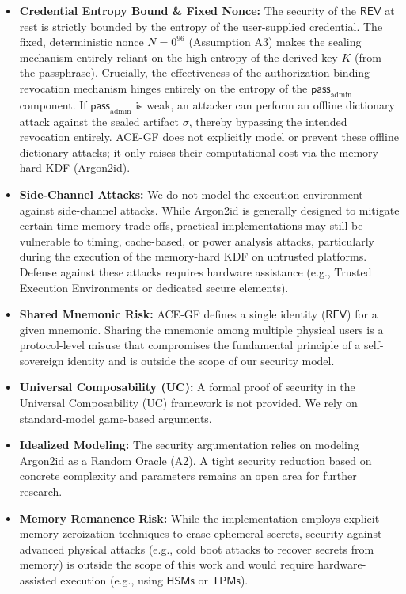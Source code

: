 \documentclass[12pt,a4paper]{article}
\begin{document}
  \begin{itemize}
   \item \textbf{Credential Entropy Bound \& Fixed Nonce:} The security of the $\mathsf{REV}$ at rest is strictly bounded by the entropy of the user-supplied credential. The fixed, deterministic nonce $N=0^{96}$ (Assumption A3) makes the sealing mechanism entirely reliant on the high entropy of the derived key $K$ (from the passphrase). Crucially, the effectiveness of the authorization-binding revocation mechanism hinges entirely on the entropy of the $\mathsf{pass}_{\mathrm{admin}}$ component. If $\mathsf{pass}_{\mathrm{admin}}$ is weak, an attacker can perform an offline dictionary attack against the sealed artifact $\sigma$, thereby bypassing the intended revocation entirely. ACE-GF does not explicitly model or prevent these offline dictionary attacks; it only raises their computational cost via the memory-hard KDF (Argon2id).
   \item \textbf{Side-Channel Attacks:} We do not model the execution environment against side-channel attacks. While Argon2id is generally designed to mitigate certain time-memory trade-offs, practical implementations may still be vulnerable to timing, cache-based, or power analysis attacks, particularly during the execution of the memory-hard KDF on untrusted platforms. Defense against these attacks requires hardware assistance (e.g., Trusted Execution Environments or dedicated secure elements).
   \item \textbf{Shared Mnemonic Risk:} ACE-GF defines a single identity ($\mathsf{REV}$) for a given mnemonic. Sharing the mnemonic among multiple physical users is a protocol-level misuse that compromises the fundamental principle of a self-sovereign identity and is outside the scope of our security model.
   \item \textbf{Universal Composability (UC):} A formal proof of security in the Universal Composability (UC) framework is not provided. We rely on standard-model game-based arguments.
   \item \textbf{Idealized Modeling:} The security argumentation relies on modeling Argon2id as a Random Oracle (A2). A tight security reduction based on concrete complexity and parameters remains an open area for further research.
   \item \textbf{Memory Remanence Risk:} While the implementation employs explicit memory zeroization techniques to erase ephemeral secrets, security against advanced physical attacks (e.g., cold boot attacks to recover secrets from memory) is outside the scope of this work and would require hardware-assisted execution (e.g., using $\mathsf{HSMs}$ or $\mathsf{TPMs}$).
  \end{itemize}
\end{document}
